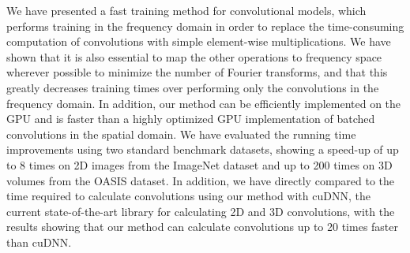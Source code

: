 We have presented a fast training method for convolutional models, which
performs training in the frequency domain in order to replace the time-consuming
computation of convolutions with simple element-wise multiplications. We have
shown that it is also essential to map the other operations to frequency space
wherever possible to minimize the number of Fourier transforms, and that this
greatly decreases training times over performing only the convolutions in the
frequency domain. In addition, our method can be efficiently implemented on the
GPU and is faster than a highly optimized GPU implementation of batched
convolutions in the spatial domain. We have evaluated the running time
improvements using two standard benchmark datasets, showing a speed-up of up to
8 times on 2D images from the ImageNet dataset and up to 200 times on 3D volumes
from the OASIS dataset. In addition, we have directly compared to the time
required to calculate convolutions using our method with cuDNN, the current
state-of-the-art library for calculating 2D and 3D convolutions, with the
results showing that our method can calculate convolutions up to 20 times faster
than cuDNN.

